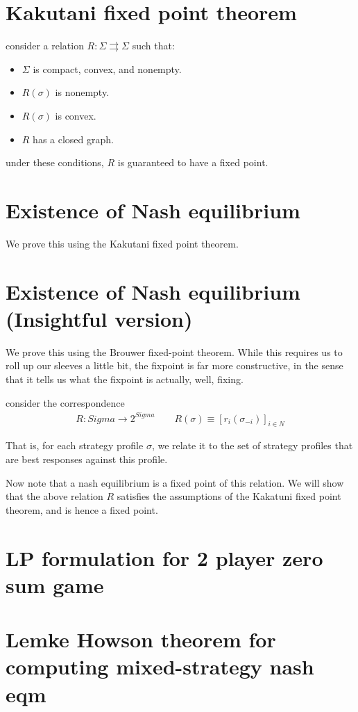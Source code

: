 \documentclass[11pt]{book}
\begin{document}
\section{Kakutani fixed point theorem}
consider a relation $R: \Sigma \rightrightarrows \Sigma$ such that:
\begin{itemize}
    \item $\Sigma$ is compact, convex, and nonempty.
    \item $R(\sigma)$ is nonempty.
    \item $R(\sigma)$ is convex.
    \item $R$ has a closed graph.
\end{itemize}

under these conditions, $R$ is guaranteed to have a fixed point.

\section{Existence of Nash equilibrium}
We prove this using the Kakutani fixed point theorem.


\section{Existence of Nash equilibrium (Insightful version)}
We prove this using the Brouwer fixed-point theorem. While this requires
us to roll up our sleeves a little bit, the fixpoint is far more constructive,
in the sense that it tells us what the fixpoint is actually, well, fixing.

consider the correspondence
\begin{align*}
    R: Sigma \rightarrow 2^{Sigma} \qquad R(\sigma) \equiv [r_i(\sigma_{-i})]_{i \in N}
\end{align*}

That is, for each strategy profile $\sigma$, we relate it to the set
of strategy profiles that are best responses against this profile.

Now note that a nash equilibrium is a fixed point of this relation.
We will show that the above relation $R$ satisfies the assumptions
of the Kakatuni fixed point theorem, and is hence a fixed point.


\section{LP formulation for 2 player zero sum game}
\section{Lemke Howson theorem for computing mixed-strategy nash eqm}
\end{document}
